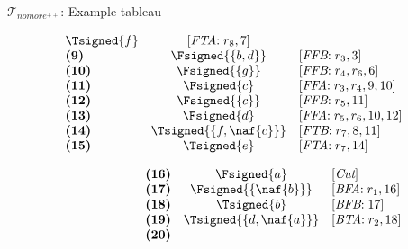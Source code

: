 \begin{frame}{$\mathcal{T}_{\textit{nomore}^{++}}$: Example tableau}
\begin{center}
\begin{minipage}[t]{16cm}
\begin{minipage}[t]{4.5cm}
\[\begin{array}{lcl}
  \Tsigned{f}                                      &
  [\textit{FTA}{:}\;r_8, \text{7}]                 \\
\textbf{(9)}                                       &
  \Fsigned{\{b,d\}}                                &
  [\textit{FFB}{:}\;r_3, \text{3}]                 \\
\textbf{(10)}                                      &
  \Fsigned{\{g\}}                                  &
  [\textit{FFB}{:}\;r_4, r_6, \text{6}]            \\
\textbf{(11)}                                      &
  \Fsigned{c}                                      &
  [\textit{FFA}{:}\;r_3,r_4, \text{9}, \text{10}]  \\
\textbf{(12)}                                      &
  \Fsigned{\{c\}}                                  &
  [\textit{FFB}{:}\;r_5, \text{11}]                \\
\textbf{(13)}                                      &
  \Fsigned{d}                                      &
  [\textit{FFA}{:}\;r_5,r_6, \text{10}, \text{12}] \\
\textbf{(14)}                                      &
  \Tsigned{\{f,\naf{c}\}}                   &
  [\textit{FTB}{:}\;r_7, \text{8}, \text{11}]      \\
\textbf{(15)}                                      &
  \Tsigned{e}                                      &
  [\textit{FTA}{:}\;r_7, \text{14}]
\end{array}
\]
\end{minipage}
\begin{minipage}[t]{6cm}
\[
\hspace{2.2cm}
\begin{array}{lcl}
\textbf{(16)}                                      &
  \Fsigned{a}                                      &
  [\textit{Cut}]                                   \\
\textbf{(17)}                                      &
  \Fsigned{\{\naf{b}\}}                     &
  [\textit{BFA}{:}\; r_1, \text{16}]               \\
\textbf{(18)}                                      &
  \Tsigned{b}                                      &
  [\textit{BFB}{:}\; \text{17}]                    \\
\textbf{(19)}                                      &
  \Tsigned{\{d,\naf{a}\}}                   &
  [\textit{BTA}{:}\;r_2, \text{18}]                \\
\textbf{(20)}                                      &

\end{array}\]
\end{minipage}
\end{minipage}
\end{center}
\end{frame}
